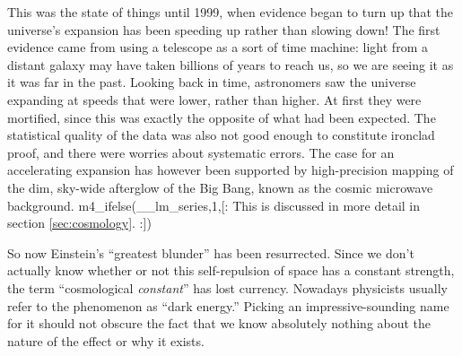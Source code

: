 This was the state of things until 1999, when evidence began
to turn up that the universe's expansion has been speeding
up rather than slowing down! The first evidence came from
using a telescope as a sort of time machine: light from a
distant galaxy may have taken billions of years to reach us,
so we are seeing it as it was far in the past. Looking back
in time, astronomers saw the universe expanding at speeds
that were lower, rather than higher. At first they were
mortified, since this was exactly the opposite of what had
been expected. The statistical quality of the data was also
not good enough to constitute ironclad proof, and there were
worries about systematic errors. The case for an accelerating
expansion has however been supported by high-precision
mapping of the dim, sky-wide afterglow of the Big Bang,
known as the cosmic microwave background.\label{cmb}
m4_ifelse(__lm_series,1,[:%
This is discussed in more detail in section \ref{sec:cosmology}.
:])

So now Einstein's
``greatest blunder'' has been resurrected. Since we don't actually know whether or not this self-repulsion
of space has a constant strength, the term ``cosmological \emph{constant}'' has
lost currency. Nowadays physicists usually refer to the phenomenon as ``dark
energy.'' Picking an impressive-sounding name for it should not obscure the fact
that we know absolutely nothing about the nature of the effect or why it exists.
